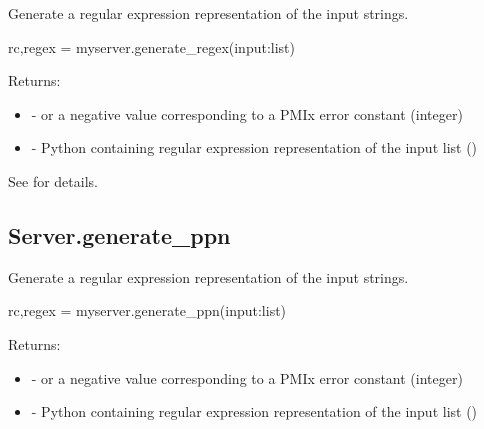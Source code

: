 \summary
Generate a regular expression representation of the input strings.

\format

\pyspecificstart
\begin{codepar}
rc,regex = myserver.generate_regex(input:list)
\end{codepar}
\pyspecificend


\begin{arglist}
\end{arglist}

Returns:

\begin{itemize}
    \item {} -  or a negative value corresponding to a PMIx error constant (integer)
    \item {} - Python  containing regular expression representation of the input list ()
\end{itemize}

See  for details.


\subsection{Server.generate_ppn}

\summary
Generate a regular expression representation of the input strings.

\format

\pyspecificstart
\begin{codepar}
rc,regex = myserver.generate_ppn(input:list)
\end{codepar}
\pyspecificend


\begin{arglist}
\end{arglist}

Returns:

\begin{itemize}
    \item {} -  or a negative value corresponding to a PMIx error constant (integer)
    \item {} - Python  containing regular expression representation of the input list ()
\end{itemize}

